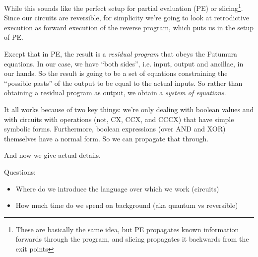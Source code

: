 \documentclass[sigplan]{acmart}
\begin{document}
While this sounds like the perfect setup for partial evaluation (PE) or slicing\footnote{
These are basically the same idea, but PE propagates known information forwards
through the program, and slicing propagates it backwards from the exit points}.
Since our circuits are reversible, for simplicity we're going to look at retrodictive
execution as forward execution of the reverse program, which puts us in the setup of PE.

Except that in PE, the result is a \emph{residual program} that obeys the Futumura equations.
In our case, we have ``both sides'', i.e. input, output and ancillae, in our hands. So the
result is going to be a set of equations constraining the ``possible pasts'' of the output
to be equal to the actual inputs. So rather than obtaining a residual program as output,
we obtain a \emph{system of equations}.

It all works because of two key things: we're only dealing with boolean values and with
circuits with operations (not, CX, CCX, and CCCX) that have simple symbolic forms.
Furthermore, boolean expressions (over AND and XOR) themselves have a normal form. So
we can propagate that through.

And now we give actual details.

Questions:
\begin{itemize}
  \item Where do we introduce the language over which we work (circuits)
  \item How much time do we spend on background (aka quantum vs reversible)
\end{itemize}
\end{document}
